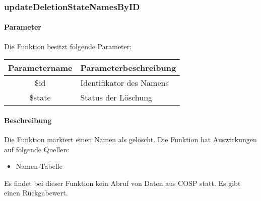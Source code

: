 \subsubsection{updateDeletionStateNamesByID}
\paragraph{Parameter} Die Funktion besitzt folgende Parameter:
\begin{table}[H]
	\begin{tabular}{|c|p{11cm}|}
		\hline
		\textbf{Parametername} & \textbf{Parameterbeschreibung} \\ \hline
		\$id    & Identifikator des Namens \\ \hline
		\$state & Status der Löschung \\ \hline
	\end{tabular}
\end{table}
\paragraph{Beschreibung} Die Funktion markiert einen Namen als gelöscht. Die Funktion hat Auswirkungen auf folgende Quellen:
\begin{itemize}
	\item Namen-Tabelle
\end{itemize}
Es findet bei dieser Funktion kein Abruf von Daten aus {\glqq COSP\grqq} statt. Es gibt einen Rückgabewert.